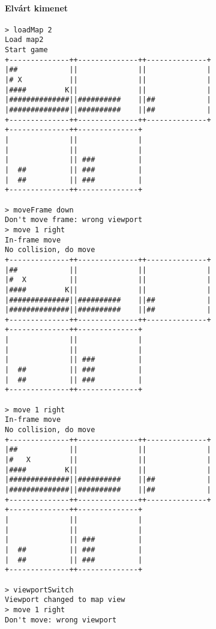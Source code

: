 		        \paragraph*{Elvárt kimenet}
\begin{verbatim}
> loadMap 2
Load map2
Start game
+--------------++--------------++--------------+
|##            ||              ||              |
|# X           ||              ||              |
|####         K||              ||              |
|##############||##########    ||##            |
|##############||##########    ||##            |
+--------------++--------------++--------------+
+--------------++--------------+                
|              ||              |                
|              ||              |                
|              || ###          |                
|  ##          || ###          |                
|  ##          || ###          |                
+--------------++--------------+                

> moveFrame down
Don't move frame: wrong viewport
> move 1 right
In-frame move
No collision, do move
+--------------++--------------++--------------+
|##            ||              ||              |
|#  X          ||              ||              |
|####         K||              ||              |
|##############||##########    ||##            |
|##############||##########    ||##            |
+--------------++--------------++--------------+
+--------------++--------------+                
|              ||              |                
|              ||              |                
|              || ###          |                
|  ##          || ###          |                
|  ##          || ###          |                
+--------------++--------------+                

> move 1 right
In-frame move
No collision, do move
+--------------++--------------++--------------+
|##            ||              ||              |
|#   X         ||              ||              |
|####         K||              ||              |
|##############||##########    ||##            |
|##############||##########    ||##            |
+--------------++--------------++--------------+
+--------------++--------------+                
|              ||              |                
|              ||              |                
|              || ###          |                
|  ##          || ###          |                
|  ##          || ###          |                
+--------------++--------------+                

> viewportSwitch
Viewport changed to map view
> move 1 right
Don't move: wrong viewport
\end{verbatim}
	
